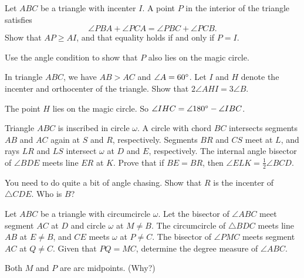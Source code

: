 \documentclass[11pt]{scrartcl}
\begin{document}
\begin{problem}
	[IMO 2006] Let $ABC$ be a triangle with incenter $I$. A point $P$ in the interior of the triangle satisfies \[\angle PBA+\angle PCA = \angle PBC+\angle PCB.\] Show that $AP \geq AI$, and that equality holds if and only if $P=I$.
	\begin{hint}
		Use the angle condition to show that $P$ also lies on the magic circle.
	\end{hint}
\end{problem}


\begin{problem}
	[APMO 2007] In triangle $ABC$, we have $AB > AC$ and $\angle A = 60^\circ$.
	Let $I$ and $H$ denote the incenter and orthocenter of the triangle.
	Show that $2\angle AHI = 3\angle B$.
	\begin{hint}
		The point $H$ lies on the magic circle.
		So $\angle IHC = \angle 180^\circ - \angle IBC$.
	\end{hint}
\end{problem}

\begin{problem}
	 Triangle $ABC$ is inscribed in circle $\omega$.  A circle with chord $BC$ intersects segments $AB$ and $AC$ again at $S$ and $R$, respectively.  Segments $BR$ and $CS$ meet at $L$, and rays $LR$ and $LS$ intersect $\omega$ at $D$ and $E$, respectively.  The internal angle bisector of $\angle BDE$ meets line $ER$ at $K$.  Prove that if $BE = BR$, then $\angle ELK = \tfrac{1}{2} \angle BCD$.
	\begin{hint}
		You need to do quite a bit of angle chasing.
		Show that $R$ is the incenter of $\triangle CDE$.
		Who is $B$?
	\end{hint}
\end{problem}

\begin{problem}
	Let $ABC$ be a triangle with circumcircle $\omega$. Let the bisector of $\angle ABC$ meet segment $AC$ at $D$ and circle $\omega$ at $M\ne B$. The circumcircle of $\triangle BDC$ meets line $AB$ at $E\ne B$, and $CE$ meets $\omega$ at $P\ne C$. The bisector of $\angle PMC$ meets segment $AC$ at $Q\ne C$. Given that $PQ = MC$, determine the degree measure of $\angle ABC$.
	\begin{hint}
		Both $M$ and $P$ are arc midpoints. (Why?)
	\end{hint}
\end{problem}
\end{document}
